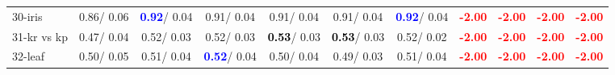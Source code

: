 \begin{table}[h]
\begin{center}
{\begin{tabular}{lc|c|c|c|c|c|c|c|c|c}
30-iris &   0.86/  0.06 & \textcolor{blue}{\textbf{  0.92}}/  0.04 &   0.91/  0.04 &   0.91/  0.04 &   0.91/  0.04 & \textcolor{blue}{\textbf{  0.92}}/  0.04 & \textcolor{red}{\textbf{ -2.00}} & \textcolor{red}{\textbf{ -2.00}} & \textcolor{red}{\textbf{ -2.00}} & \textcolor{red}{\textbf{ -2.00}} \\
31-kr vs kp &   0.47/  0.04 &   0.52/  0.03 &   0.52/  0.03 & \textcolor{black}{\textbf{  0.53}}/  0.03 & \textcolor{black}{\textbf{  0.53}}/  0.03 &   0.52/  0.02 & \textcolor{red}{\textbf{ -2.00}} & \textcolor{red}{\textbf{ -2.00}} & \textcolor{red}{\textbf{ -2.00}} & \textcolor{red}{\textbf{ -2.00}} \\
32-leaf &   0.50/  0.05 &   0.51/  0.04 & \textcolor{blue}{\textbf{  0.52}}/  0.04 &   0.50/  0.04 &   0.49/  0.03 &   0.51/  0.04 & \textcolor{red}{\textbf{ -2.00}} & \textcolor{red}{\textbf{ -2.00}} & \textcolor{red}{\textbf{ -2.00}} & \textcolor{red}{\textbf{ -2.00}} \\\end{tabular}}\label{stratsALCKappa0b5NNaRedux}
\end{center}
\end{table}
